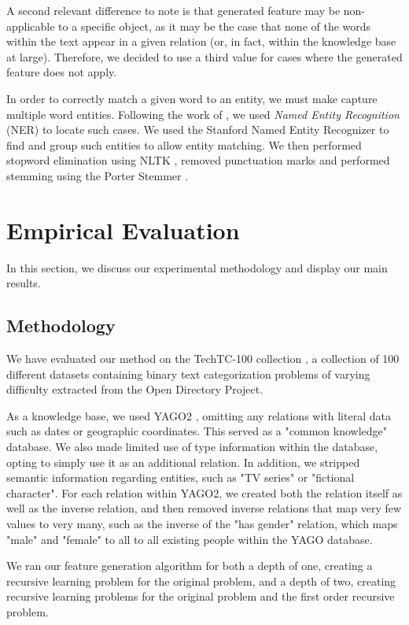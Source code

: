 \documentclass[twoside,11pt]{article}
\theoremstyle{definition}
\begin{document}
A second relevant difference to note is that generated feature may be non-applicable to a specific object, as it may be the case that none of the words within the text appear in a given relation (or, in fact, within the knowledge base at large). Therefore, we decided to use a third value for cases where the generated feature does not apply.

In order to correctly match a given word to an entity, we must make capture multiple word entities. Following the work of \citet{paulheim2012unsupervised}, we used \emph{Named Entity Recognition} (NER) to locate such cases. We used the Stanford Named Entity Recognizer \citep{finkel2005incorporating} to find and group such entities to allow entity matching. We then performed stopword elimination using NLTK \citep{bird2009natural} , removed punctuation marks and performed stemming using the Porter Stemmer \citep{van1980new}.


\section{Empirical Evaluation}
In this section, we discuss our experimental methodology and display our main results.
\subsection{Methodology}
We have evaluated our method on the TechTC-100 collection \citep{gabrilovich2004text}, a collection of 100 different datasets containing binary text categorization problems of varying difficulty extracted from the Open Directory Project.

As a knowledge base, we used YAGO2 \citep{hoffart2013yago2}, omitting any relations with literal data such as dates or geographic coordinates. This served as a "common knowledge" database. We also made limited use of type information within the database, opting to simply use it as an additional relation.
In addition, we stripped semantic information regarding entities, such as "TV series" or "fictional character". For each relation within YAGO2, we created both the relation itself as well as the inverse relation, and then removed inverse relations that map very few values to very many, such as the inverse of the "has gender" relation, which maps "male" and "female" to all to all existing people within the YAGO database.

We ran our feature generation algorithm for both a depth of one, creating a recursive learning problem for the original problem, and a depth of two, creating recursive learning problems for the original problem and the first order recursive problem.
\end{document}
